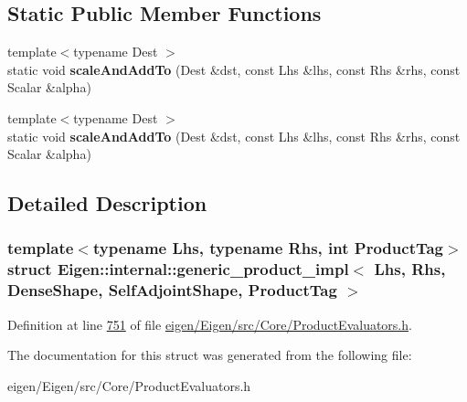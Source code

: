 \subsection*{Static Public Member Functions}
\begin{DoxyCompactItemize}
\item 
\mbox{\label{struct_eigen_1_1internal_1_1generic__product__impl_3_01_lhs_00_01_rhs_00_01_dense_shape_00_01_se2e8cb7106d8225767d620f93988c2a09_acb282096359c329ede83f39f8d21f642}} 
{\footnotesize template$<$typename Dest $>$ }\\static void {\bfseries scale\+And\+Add\+To} (Dest \&dst, const Lhs \&lhs, const Rhs \&rhs, const Scalar \&alpha)
\item 
\mbox{\label{struct_eigen_1_1internal_1_1generic__product__impl_3_01_lhs_00_01_rhs_00_01_dense_shape_00_01_se2e8cb7106d8225767d620f93988c2a09_acb282096359c329ede83f39f8d21f642}} 
{\footnotesize template$<$typename Dest $>$ }\\static void {\bfseries scale\+And\+Add\+To} (Dest \&dst, const Lhs \&lhs, const Rhs \&rhs, const Scalar \&alpha)
\end{DoxyCompactItemize}


\subsection{Detailed Description}
\subsubsection*{template$<$typename Lhs, typename Rhs, int Product\+Tag$>$\newline
struct Eigen\+::internal\+::generic\+\_\+product\+\_\+impl$<$ Lhs, Rhs, Dense\+Shape, Self\+Adjoint\+Shape, Product\+Tag $>$}



Definition at line \hyperlink{eigen_2_eigen_2src_2_core_2_product_evaluators_8h_source_l00751}{751} of file \hyperlink{eigen_2_eigen_2src_2_core_2_product_evaluators_8h_source}{eigen/\+Eigen/src/\+Core/\+Product\+Evaluators.\+h}.



The documentation for this struct was generated from the following file\+:\begin{DoxyCompactItemize}
\item 
eigen/\+Eigen/src/\+Core/\+Product\+Evaluators.\+h\end{DoxyCompactItemize}
